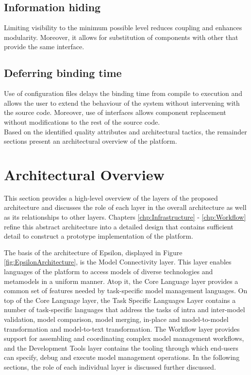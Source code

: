 \subsection{Information hiding}
Limiting visibility to the minimum possible level reduces coupling and enhances modularity. Moreover, it allows for substitution of components with other that provide the same interface.

\subsection{Deferring binding time}
Use of configuration files delays the binding time from compile to execution and allows the user to extend the behaviour of the system without intervening with the source code. Moreover, use of interfaces allows component replacement without modifications to the rest of the source code.\\

\noindent Based on the identified quality attributes and architectural tactics, the remainder sections present an architectural overview of the platform.

\section{Architectural Overview}
\label{sec:Architecture.ArchitecturalOverview}

This section provides a high-level overview of the layers of the proposed architecture and discusses the role of each layer in the overall architecture as well as its relationships to other layers. Chapters \ref{chp:Infrastructure} - \ref{chp:Workflow} refine this abstract architecture into a detailed design that contains sufficient detail to construct a prototype implementation of the platform.

The basis of the architecture of Epsilon, displayed in Figure \ref{fig:EpsilonArchitecture}, is the Model Connectivity layer. This layer enables languages of the platform to access models of diverse technologies and metamodels in a uniform manner. Atop it, the Core Language layer provides a common set of features needed by task-specific model management languages. On top of the Core Language layer, the Task Specific Languages Layer contains a number of task-specific languages that address the tasks of intra and inter-model validation, model comparison, model merging, in-place and model-to-model transformation and model-to-text transformation. The Workflow layer provides support for assembling and coordinating complex model management workflows, and the Development Tools layer contains the tooling through which end-users can specify, debug and execute model management operations. In the following sections, the role of each individual layer is discussed further discussed.

